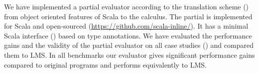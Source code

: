 We have implemented a partial evaluator according to the translation scheme ()
 from object oriented features of Scala to the \calculus calculus. The partial is
 implemented for Scala and open-sourced (\url{https://github.com/scala-inline/}).
 It has a minimal Scala interface () based on type annotations.
 We have evaluated the performance gains and the validity of the partial evaluator
 on all case studies () and compared them to LMS. In all benchmarks
 our evaluator gives significant performance gains compared to original programs and
 performs equivalently to LMS.







